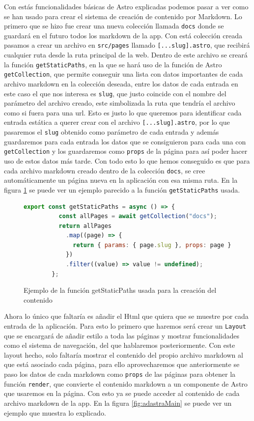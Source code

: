 Con estás funcionalidades básicas de Astro explicadas podemos pasar a ver como se han usado para crear el sistema de creación de contenido por Markdown. Lo primero que se hizo fue crear una nueva colección llamada \verb|docs| donde se guardará en el futuro todos los markdown de la app. Con está colección creada pasamos a crear un archivo en \verb|src/pages| llamado \verb|[...slug].astro|, que recibirá cualquier ruta desde la ruta principal de la web. Dentro de este archivo se creará la función \verb|getStaticPaths|, en la que se hará uso de la función de Astro \verb|getCollection|, que permite conseguir una lista con datos importantes de cada archivo markdown en la colección deseada, entre los datos de cada entrada en este caso el que nos interesa es \verb|slug|, que justo coincide con el nombre del parámetro del archivo creado, este simbolizada la ruta que tendría el archivo como si fuera para una url. Esto es justo lo que queremos para identificar cada entrada estática a querer crear con el archivo \verb|[...slug].astro|, por lo que pasaremos el \verb|slug| obtenido como parámetro de cada entrada y además guardaremos para cada entrada los datos que se consiguieron para cada una con \verb|getCollection| y los guardaremos como \verb|props| de la página para así poder hacer uso de estos datos más tarde. Con todo esto lo que hemos conseguido es que para cada archivo markdown creado dentro de la colección \verb|docs|, se cree automáticamente un página nueva en la aplicación con esa misma ruta. En la figura \ref{fig:adastraStaticPaths} se puede ver un ejemplo parecido a la función \verb|getStaticPaths| usada.

\begin{figure}
    \begin{lstlisting}[language=Javascript]
        export const getStaticPaths = async () => {
          const allPages = await getCollection("docs");
          return allPages
            .map((page) => {
              return { params: { page.slug }, props: page };
            })
            .filter((value) => value != undefined);
        };
    \end{lstlisting}
    \caption{Ejemplo de la función getStaticPaths usada para la creación del contenido}
    \label{fig:adastraStaticPaths}
\end{figure}

Ahora lo único que faltaría es añadir el Html que quiera que se muestre por cada entrada de la aplicación. Para esto lo primero que haremos será crear un \verb|Layout| que se encargará de añadir estilo a toda las páginas y mostrar funcionalidades como el sistema de navegación, del que hablaremos posteriormente. Con este layout hecho, solo faltaría mostrar el contenido del propio archivo markdown al que está asociado cada página, para ello aprovecharemos que anteriormente se paso los datos de cada markdown como \verb|props| de las páginas para obtener la función \verb|render|, que convierte el contenido markdown a un componente de Astro que usaremos en la página. Con esto ya se puede acceder al contenido de cada archivo markdown de la app. En la figura \ref{fig:adastraMain} se puede ver un ejemplo que muestra lo explicado.

